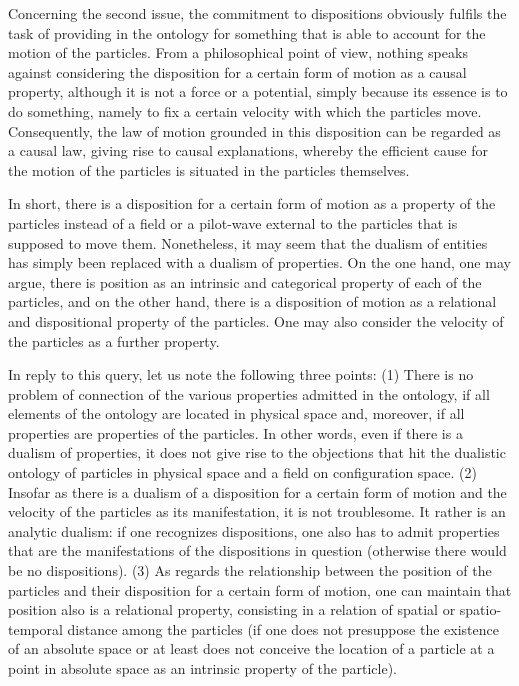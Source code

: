 \documentclass[12pt]{article}
\theoremstyle{definition}
\begin{document}
Concerning the second issue, the commitment to dispositions obviously fulfils the task of providing in the ontology for something that is able to account for the motion of the particles. From a philosophical point of view, nothing speaks against considering the disposition for a certain form of motion as a causal property, although it is not a force or a potential, simply because its essence is to do something, namely to fix a certain velocity with which the particles move. Consequently, the law of motion grounded in this disposition can be regarded as a causal law, giving rise to causal explanations, whereby the efficient cause for the motion of the particles is situated in the particles themselves.

In short, there is a disposition for a certain form of motion as a property of the particles instead of a field or a pilot-wave external to the particles that is supposed to move them. Nonetheless, it may seem that the dualism of entities has simply been replaced with a dualism of properties. On the one hand, one may argue, there is position as an intrinsic and categorical property of each of the particles, and on the other hand, there is a disposition of motion as a relational and dispositional property of the particles. One may also consider the velocity of the particles as a further property.

In reply to this query, let us note the following three points: (1) There is no problem of connection of the various properties admitted in the ontology, if all elements of the ontology are located in physical space and, moreover, if all properties are properties of the particles. In other words, even if there is a dualism of properties, it does not give rise to the objections that hit the dualistic ontology of particles in physical space and a field on configuration space. (2) Insofar as there is a dualism of a disposition for a certain form of motion and the velocity of the particles as its manifestation, it is not troublesome. It rather is an analytic dualism: if one recognizes dispositions, one also has to admit properties that are the manifestations of the dispositions in question (otherwise there would be no dispositions). (3) As regards the relationship between the position of the particles and their disposition for a certain form of motion, one can maintain that position also is a relational property, consisting in a relation of spatial or spatio-temporal distance among the particles (if one does not presuppose the existence of an absolute space or at least does not conceive the location of a particle at a point in absolute space as an intrinsic property of the particle).
\end{document}
